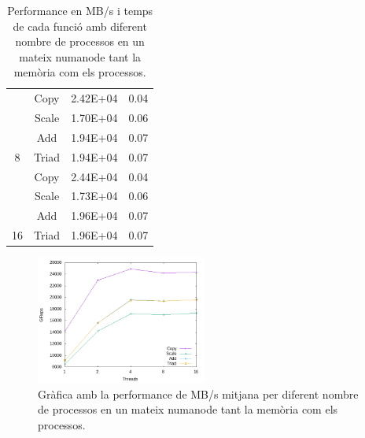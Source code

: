 \begin{table}[h]
\begin{tabular}{cccc}
                     & \cellcolor[HTML]{EFEFEF}Copy & \cellcolor[HTML]{EFEFEF}2.42E+04 & \cellcolor[HTML]{EFEFEF}0.04 \\
                     & Scale                        & 1.70E+04                         & 0.06                         \\
                     & \cellcolor[HTML]{EFEFEF}Add  & \cellcolor[HTML]{EFEFEF}1.94E+04 & \cellcolor[HTML]{EFEFEF}0.07 \\
\multirow{-4}{*}{8}  & Triad                        & 1.94E+04                         & 0.07                         \\ \hline
                     & \cellcolor[HTML]{EFEFEF}Copy & \cellcolor[HTML]{EFEFEF}2.44E+04 & \cellcolor[HTML]{EFEFEF}0.04 \\
                     & Scale                        & 1.73E+04                         & 0.06                         \\
                     & \cellcolor[HTML]{EFEFEF}Add  & \cellcolor[HTML]{EFEFEF}1.96E+04 & \cellcolor[HTML]{EFEFEF}0.07 \\
\multirow{-4}{*}{16} & Triad                        & 1.96E+04                         & 0.07                         \\ \hline
\end{tabular}
    \caption{Performance en MB/s i temps de cada funció amb diferent nombre de processos en un mateix numanode tant la memòria com els processos.}
    \label{tab:stream_binding_same_perf}
\end{table}

\begin{figure}[h]
    \centering
    \includegraphics[width=0.5\textwidth]{img/stream_binding_one_same_grafica.png}
    \caption{Gràfica amb la performance de MB/s mitjana per diferent nombre de processos en un mateix numanode tant la memòria com els processos.}
    \label{fig:stream_binding_one_same_perf}
\end{figure}

